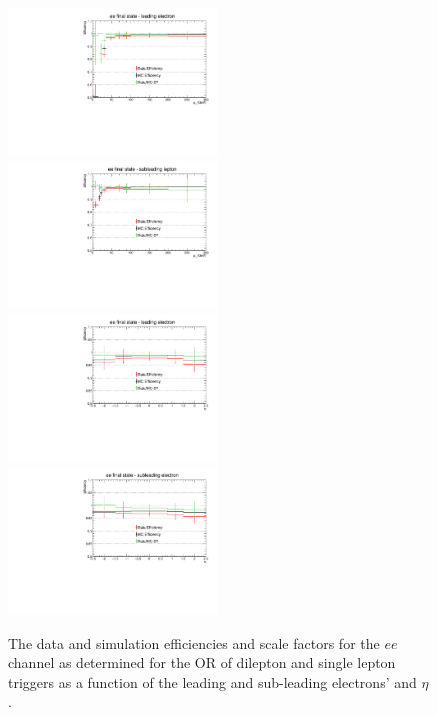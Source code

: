 \begin{figure}[ht]
\centering
\includegraphics[width=0.495\textwidth]{figs/background-estimation/triggerEfficiency/ttbar/electron1_pT_SF.pdf}
\includegraphics[width=0.495\textwidth]{figs/background-estimation/triggerEfficiency/ttbar/electron2_pT_SF.pdf}
\\
\includegraphics[width=0.495\textwidth]{figs/background-estimation/triggerEfficiency/ttbar/electron1_eta_SF.pdf}
\includegraphics[width=0.495\textwidth]{figs/background-estimation/triggerEfficiency/ttbar/electron2_eta_SF.pdf}
\caption{
The data and \ttbar simulation efficiencies and scale factors for the $ee$ channel as determined for the OR of dilepton and single lepton triggers as a function of the leading and sub-leading electrons' \pT and $\eta$.
}
\label{fig:App_trigEff_ee}
\end{figure}

